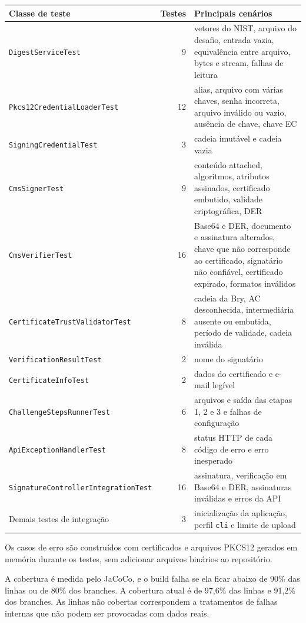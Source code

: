 \documentclass[12pt,a4paper]{article}
\begin{document}
\begin{center}
\footnotesize
\begin{tabularx}{\textwidth}{lrX}
\toprule
\textbf{Classe de teste} & \textbf{Testes} & \textbf{Principais cenários} \\
\midrule
\texttt{DigestServiceTest} & 9 & vetores do NIST, arquivo do desafio, entrada vazia, equivalência entre arquivo, bytes e stream, falhas de leitura \\
\texttt{Pkcs12CredentialLoaderTest} & 12 & alias, arquivo com várias chaves, senha incorreta, arquivo inválido ou vazio, ausência de chave, chave EC \\
\texttt{SigningCredentialTest} & 3 & cadeia imutável e cadeia vazia \\
\texttt{CmsSignerTest} & 9 & conteúdo attached, algoritmos, atributos assinados, certificado embutido, validade criptográfica, DER \\
\texttt{CmsVerifierTest} & 16 & Base64 e DER, documento e assinatura alterados, chave que não corresponde ao certificado, signatário não confiável, certificado expirado, formatos inválidos \\
\texttt{CertificateTrustValidatorTest} & 8 & cadeia da Bry, AC desconhecida, intermediária ausente ou embutida, período de validade, cadeia inválida \\
\texttt{VerificationResultTest} & 2 & nome do signatário \\
\texttt{CertificateInfoTest} & 2 & dados do certificado e e-mail legível \\
\texttt{ChallengeStepsRunnerTest} & 6 & arquivos e saída das etapas 1, 2 e 3 e falhas de configuração \\
\texttt{ApiExceptionHandlerTest} & 8 & status HTTP de cada código de erro e erro inesperado \\
\texttt{SignatureControllerIntegrationTest} & 16 & assinatura, verificação em Base64 e DER, assinaturas inválidas e erros da API \\
Demais testes de integração & 3 & inicialização da aplicação, perfil \texttt{cli} e limite de upload \\
\bottomrule
\end{tabularx}
\end{center}

Os casos de erro são construídos com certificados e arquivos PKCS12 gerados em memória durante os testes, sem adicionar arquivos binários ao repositório.

A cobertura é medida pelo JaCoCo, e o build falha se ela ficar abaixo de 90\% das linhas ou de 80\% dos branches. A cobertura atual é de 97,6\% das linhas e 91,2\% dos branches. As linhas não cobertas correspondem a tratamentos de falhas internas que não podem ser provocadas com dados reais.
\end{document}
